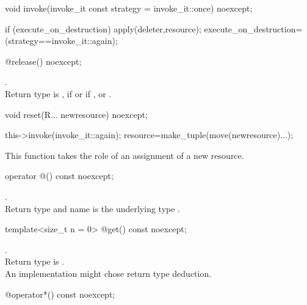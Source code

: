 \documentclass[ebook,11pt,article]{memoir}
\begin{document}
\begin{itemdecl}
	void invoke(invoke_it const strategy = invoke_it::once) noexcept;
\end{itemdecl}

\pnum
\effects 
\begin{codeblock}
if (execute_on_destruction) 
    apply(deleter,resource); 
execute_on_destruction=(strategy==invoke_it::again);
\end{codeblock}

\begin{itemdecl}
	@\seebelow@ release() noexcept;
\end{itemdecl}

\pnum
\effects {}

\pnum
\returns {}. 
\\Return type is , if  or  if , or .

\begin{itemdecl}
	void reset(R... newresource) noexcept;
\end{itemdecl}

\pnum
\effects 
\begin{codeblock}
this->invoke(invoke_it::again); 
resource=make_tuple(move(newresource)...);
\end{codeblock}

\pnum
\enternote This function takes the role of an assignment of a new resource.
\exitnote

\begin{itemdecl}
	operator  @\seebelow@() const noexcept;
\end{itemdecl}

\pnum
\returns {}.
\\Return type and  name is the underlying type . 

\begin{itemdecl}
	template<size_t n = 0>
	@\seebelow@  get() const noexcept;
\end{itemdecl}

\pnum
\returns {}.
\\Return type is . 
\\\enternote An implementation might chose  return type deduction.
\exitnote

\begin{itemdecl}
	@\seebelow@  operator*() const noexcept;
\end{itemdecl}
\end{document}
